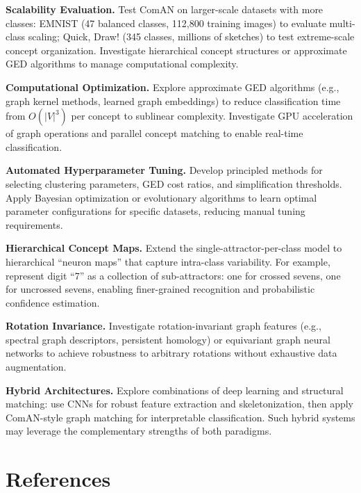 \documentclass[12pt, a4paper]{article}
\begin{document}
\textbf{Scalability Evaluation.} Test ComAN on larger-scale datasets with more classes: EMNIST (47 balanced classes, 112,800 training images) to evaluate multi-class scaling; Quick, Draw! (345 classes, millions of sketches) to test extreme-scale concept organization. Investigate hierarchical concept structures or approximate GED algorithms to manage computational complexity.

\textbf{Computational Optimization.} Explore approximate GED algorithms (e.g., graph kernel methods, learned graph embeddings) to reduce classification time from $O(|V|^3)$ per concept to sublinear complexity. Investigate GPU acceleration of graph operations and parallel concept matching to enable real-time classification.

\textbf{Automated Hyperparameter Tuning.} Develop principled methods for selecting clustering parameters, GED cost ratios, and simplification thresholds. Apply Bayesian optimization or evolutionary algorithms to learn optimal parameter configurations for specific datasets, reducing manual tuning requirements.

\textbf{Hierarchical Concept Maps.} Extend the single-attractor-per-class model to hierarchical ``neuron maps'' that capture intra-class variability. For example, represent digit ``7'' as a collection of sub-attractors: one for crossed sevens, one for uncrossed sevens, enabling finer-grained recognition and probabilistic confidence estimation.

\textbf{Rotation Invariance.} Investigate rotation-invariant graph features (e.g., spectral graph descriptors, persistent homology) or equivariant graph neural networks to achieve robustness to arbitrary rotations without exhaustive data augmentation.

\textbf{Hybrid Architectures.} Explore combinations of deep learning and structural matching: use CNNs for robust feature extraction and skeletonization, then apply ComAN-style graph matching for interpretable classification. Such hybrid systems may leverage the complementary strengths of both paradigms.

\section{References}
\end{document}
